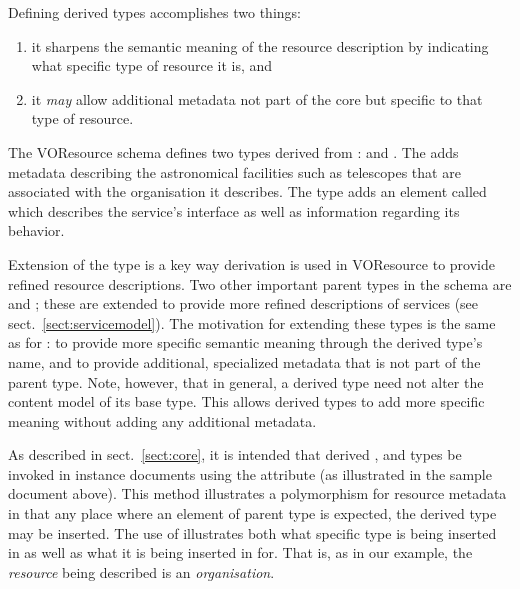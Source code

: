 \documentclass[11pt,a4paper]{ivoa}
\begin{document}
Defining derived  types accomplishes two
things:
\begin{enumerate}
  \item it sharpens the semantic meaning of the resource description by
       indicating what specific type of resource it is, and
  \item it \emph{may} allow additional metadata not part of the core
       but specific to that type of resource.
\end{enumerate}



The VOResource schema defines two types derived from
:   and
.   The  adds
metadata describing the astronomical facilities such as telescopes
that are associated with the organisation it describes.  The
 type adds an element called
 which describes the service's interface as
well as information regarding its behavior.  



Extension of the  type is a key way
derivation is used in VOResource to provide refined resource
descriptions.  Two other important parent types in the schema are
 and ; these are
extended to provide more refined descriptions of services (see
sect.~\ref{sect:servicemodel}).  The motivation for extending
these types is the same as for : to provide
more specific semantic meaning through the derived type's name, and to
provide additional, specialized metadata that is not part of the
parent type.  Note, however, that in general, a derived type need not
alter the content model of its base type.  This allows derived types
to add more specific meaning without adding any additional metadata.



As described in sect.~\ref{sect:core}, it is intended that derived
,  and 
types be invoked in instance documents using the 
attribute (as illustrated in the sample document above).  This method
illustrates a polymorphism for resource metadata in that any place where
an element of parent type is expected, the derived type may be inserted.
The use of  illustrates both what specific type is being
inserted in as well as what it is being inserted in for.  That is, as in
our example, the \emph{resource} being described is an
\emph{organisation}.  
\end{document}

